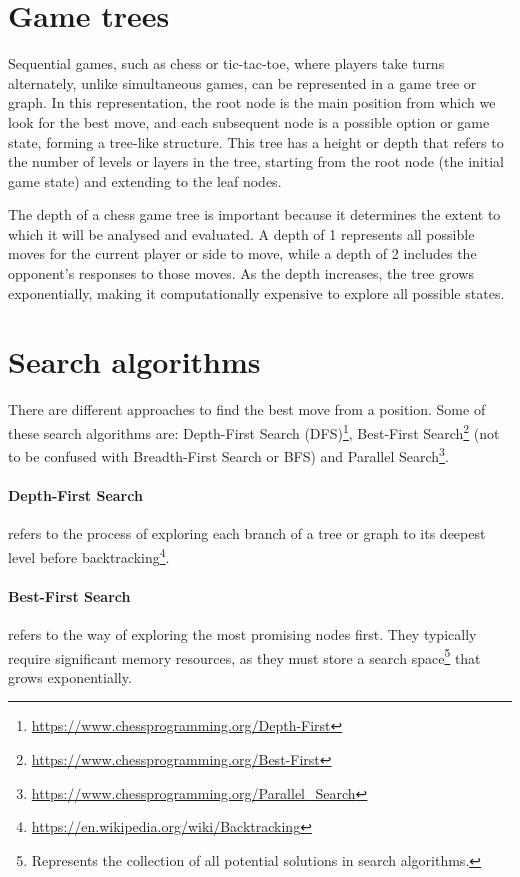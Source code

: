 \section{Game trees}

Sequential games, such as chess or tic-tac-toe, where players take turns alternately, unlike simultaneous games, can be represented in a game tree or graph. In this representation, the root node is the main position from which we look for the best move, and each subsequent node is a possible option or game state, forming a tree-like structure. This tree has a height or depth that refers to the number of levels or layers in the tree, starting from the root node (the initial game state) and extending to the leaf nodes.

\vspace{1em}

The depth of a chess game tree is important because it determines the extent to which it will be analysed and evaluated. A depth of 1 represents all possible moves for the current player or side to move, while a depth of 2 includes the opponent's responses to those moves. As the depth increases, the tree grows exponentially, making it computationally expensive to explore all possible states.

\section{Search algorithms}

There are different approaches to find the best move from a position. Some of these search algorithms are: Depth-First Search (DFS)\footnote{\url{https://www.chessprogramming.org/Depth-First}}, Best-First Search\footnote{\url{https://www.chessprogramming.org/Best-First}} (not to be confused with Breadth-First Search or BFS) and Parallel Search\footnote{\url{https://www.chessprogramming.org/Parallel_Search}}.

\paragraph{Depth-First Search} refers to the process of exploring each branch of a tree or graph to its deepest level before backtracking\footnote{\url{https://en.wikipedia.org/wiki/Backtracking}}.

\paragraph{Best-First Search} refers to the way of exploring the most promising nodes first. They typically require significant memory resources, as they must store a search space\footnote{Represents the collection of all potential solutions in search algorithms.} that grows exponentially.

